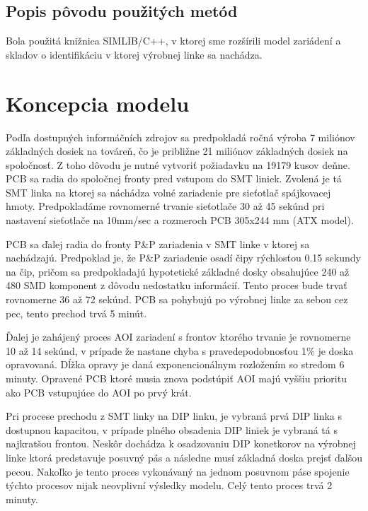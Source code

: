 \documentclass[12pt,a4paper,titlepage,final]{article}
\begin{document}
\subsection{Popis pôvodu použitých metód}
Bola použitá knižnica SIMLIB/C++, v ktorej sme rozšírili model zariádení a 
skladov o identifikáciu v ktorej výrobnej linke sa nachádza.

\section{Koncepcia modelu}

Podľa dostupných informáčních zdrojov sa predpokladá ročná výroba 7 miliónov
základných dosiek na továreň, čo je približne 21 miliónov základných dosiek
na spoločnosť\cite{gigabyte-sprava}. Z toho dôvodu je nutné vytvoriť požiadavku na 19179 kusov deňne.
PCB sa radia do spoločnej fronty pred vstupom do SMT liniek. Zvolená je tá SMT
linka na ktorej sa náchádza volné zariadenie pre sieťotlač spájkovacej hmoty.
Predpokladáme rovnomerné trvanie sieťotlače 30 až 45 sekúnd pri nastavení sieťotlače
na 10mm/sec a rozmeroch PCB 305x244 mm (ATX model)\cite{ATX}.

PCB sa ďalej radia do fronty P\&P zariadenia v SMT linke v ktorej sa nachádzajú.
Predpoklad je, že P\&P zariadenie osadí čipy rýchlosťou 0.15 sekundy na čip, pričom
sa predpokladajú hypotetické základné dosky obsahujúce 240 až 480 SMD komponent
z dôvodu nedostatku informácií. Tento proces bude trvať rovnomerne 36 až 72 sekúnd.
PCB sa pohybujú po výrobnej linke za sebou cez pec, tento prechod trvá 5 minút.

Ďalej je zahájený proces AOI zariadení s frontov ktorého trvanie je rovnomerne 10 až 14 sekúnd, v 
prípade že nastane chyba s pravedepodobnosťou 1\% je doska opravovaná. Dĺžka
opravy je daná exponencionálnym rozložením so stredom 6 minuty. Opravené PCB
ktoré musia znova podstúpiť AOI majú vyššiu prioritu ako PCB vstupujúce do AOI 
po prvý krát.

Pri procese prechodu z SMT linky na DIP linku, je vybraná prvá DIP linka s dostupnou
kapacitou, v prípade plného obsadenia DIP liniek je vybraná tá s najkratšou
frontou. Neskôr dochádza k osadzovaniu DIP konetkorov na výrobnej linke
ktorá predstavuje posuvný pás a následne musí základná doska prejsť ďalšou
pecou. Nakoľko je tento proces vykonávaný na jednom posuvnom páse spojenie týchto
procesov nijak neovplivní výsledky modelu. Celý tento proces trvá 2 minuty.
\end{document}
